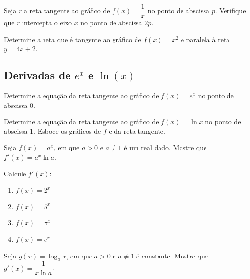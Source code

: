 \begin{exercicio}[8]
Seja $r$ a reta tangente ao gráfico de $f(x) = \dfrac{1}{x}$ no ponto de abscissa $p$. Verifique que $r$ intercepta o eixo $x$ no ponto de abscissa $2p$.
\end{exercicio}

\begin{exercicio}[9]
Determine a reta que é tangente ao gráfico de $f(x) = x^2$ e paralela à reta $y = 4x + 2$.
\end{exercicio}

\clearpage

\subsection{Derivadas de $e^x$ e $\ln(x)$}

\begin{exercicio}[1]
Determine a equação da reta tangente ao gráfico de $f(x) = e^x$ no ponto de abscissa 0.
\end{exercicio}

\begin{exercicio}[2]
Determine a equação da reta tangente ao gráfico de $f(x) = \ln x$ no ponto de abscissa 1. Esboce os gráficos de $f$ e da reta tangente.
\end{exercicio}

\begin{exercicio}[3]
Seja $f(x) = a^x$, em que $a > 0$ e $a \neq 1$ é um real dado. Mostre que $f'(x) = a^x \ln a$.
\end{exercicio}

\begin{exercicio}[4]
Calcule $f'(x)$:
\begin{enumerate}[label=\alph*)]
    \item $f(x) = 2^x$
    \item $f(x) = 5^x$
    \item $f(x) = \pi^x$
    \item $f(x) = e^x$
\end{enumerate}
\end{exercicio}

\begin{exercicio}[5]
Seja $g(x) = \log_a x$, em que $a > 0$ e $a \neq 1$ é constante. Mostre que $g'(x) = \dfrac{1}{x \ln a}$.
\end{exercicio}

